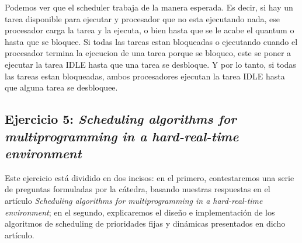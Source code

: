 Podemos ver que el scheduler trabaja de la manera esperada. Es decir, si hay un tarea disponible para ejecutar y procesador que no esta ejecutando nada,
ese procesador carga la tarea y la ejecuta, o bien hasta que se le acabe el quantum o hasta que se bloquee. Si todas las tareas estan bloqueadas 
o ejecutando cuando el procesador termina la ejecucion de una tarea porque se bloqueo, este se poner a ejecutar la tarea IDLE hasta que 
una tarea se desbloque. Y por lo tanto, si todas las tareas estan bloqueadas, ambos procesadores ejecutan la tarea IDLE hasta que alguna 
tarea se desbloquee.



\subsection{Ejercicio 5: \textit{Scheduling algorithms for multiprogramming in a hard-real-time environment}}
Este ejercicio est\'a dividido en dos incisos: en el primero, contestaremos una serie de preguntas formuladas por la c\'atedra, basando nuestras respuestas en el 
art\'iculo \textit{Scheduling algorithms for multiprogramming in a hard-real-time environment}; en el segundo, explicaremos el dise\~no e implementaci\'on 
de los algoritmos de scheduling de prioridades fijas y din\'amicas presentados en dicho art\'iculo.
